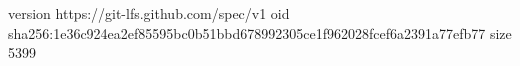 version https://git-lfs.github.com/spec/v1
oid sha256:1e36c924ea2ef85595bc0b51bbd678992305ce1f962028fcef6a2391a77efb77
size 5399
